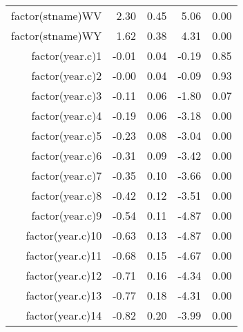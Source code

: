 \begin{table}[ht]
\begin{tabular}{rrrrr}
  factor(stname)WV & 2.30 & 0.45 & 5.06 & 0.00 \\ 
  factor(stname)WY & 1.62 & 0.38 & 4.31 & 0.00 \\ 
  factor(year.c)1 & -0.01 & 0.04 & -0.19 & 0.85 \\ 
  factor(year.c)2 & -0.00 & 0.04 & -0.09 & 0.93 \\ 
  factor(year.c)3 & -0.11 & 0.06 & -1.80 & 0.07 \\ 
  factor(year.c)4 & -0.19 & 0.06 & -3.18 & 0.00 \\ 
  factor(year.c)5 & -0.23 & 0.08 & -3.04 & 0.00 \\ 
  factor(year.c)6 & -0.31 & 0.09 & -3.42 & 0.00 \\ 
  factor(year.c)7 & -0.35 & 0.10 & -3.66 & 0.00 \\ 
  factor(year.c)8 & -0.42 & 0.12 & -3.51 & 0.00 \\ 
  factor(year.c)9 & -0.54 & 0.11 & -4.87 & 0.00 \\ 
  factor(year.c)10 & -0.63 & 0.13 & -4.87 & 0.00 \\ 
  factor(year.c)11 & -0.68 & 0.15 & -4.67 & 0.00 \\ 
  factor(year.c)12 & -0.71 & 0.16 & -4.34 & 0.00 \\ 
  factor(year.c)13 & -0.77 & 0.18 & -4.31 & 0.00 \\ 
  factor(year.c)14 & -0.82 & 0.20 & -3.99 & 0.00 \\ 
   \hline
\end{tabular}
\end{table}
